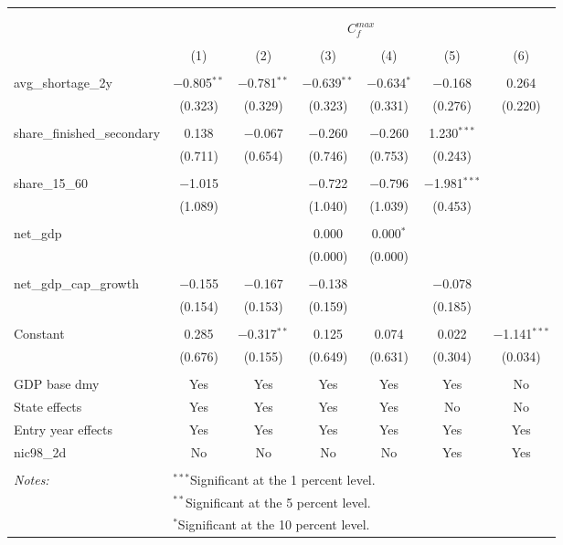 
\begingroup 
\small 
\begin{tabular}{@{\extracolsep{5pt}}lcccccc} 
\\[-1.8ex]\hline 
\hline \\[-1.8ex] 
\\[-1.8ex] & \multicolumn{6}{c}{$C^{max}_{f}$} \\ 
\\[-1.8ex] & (1) & (2) & (3) & (4) & (5) & (6)\\ 
\hline \\[-1.8ex] 
 avg\_shortage\_2y & $-$0.805$^{**}$ & $-$0.781$^{**}$ & $-$0.639$^{**}$ & $-$0.634$^{*}$ & $-$0.168 & 0.264 \\ 
  & (0.323) & (0.329) & (0.323) & (0.331) & (0.276) & (0.220) \\ 
  & & & & & & \\ 
 share\_finished\_secondary & 0.138 & $-$0.067 & $-$0.260 & $-$0.260 & 1.230$^{***}$ &  \\ 
  & (0.711) & (0.654) & (0.746) & (0.753) & (0.243) &  \\ 
  & & & & & & \\ 
 share\_15\_60 & $-$1.015 &  & $-$0.722 & $-$0.796 & $-$1.981$^{***}$ &  \\ 
  & (1.089) &  & (1.040) & (1.039) & (0.453) &  \\ 
  & & & & & & \\ 
 net\_gdp &  &  & 0.000 & 0.000$^{*}$ &  &  \\ 
  &  &  & (0.000) & (0.000) &  &  \\ 
  & & & & & & \\ 
 net\_gdp\_cap\_growth & $-$0.155 & $-$0.167 & $-$0.138 &  & $-$0.078 &  \\ 
  & (0.154) & (0.153) & (0.159) &  & (0.185) &  \\ 
  & & & & & & \\ 
 Constant & 0.285 & $-$0.317$^{**}$ & 0.125 & 0.074 & 0.022 & $-$1.141$^{***}$ \\ 
  & (0.676) & (0.155) & (0.649) & (0.631) & (0.304) & (0.034) \\ 
  & & & & & & \\ 
GDP base dmy & Yes & Yes & Yes & Yes & Yes & No \\ 
State effects & Yes & Yes & Yes & Yes & No & No \\ 
Entry year effects & Yes & Yes & Yes & Yes & Yes & Yes \\ 
nic98_2d & No & No & No & No & Yes & Yes \\ 
\hline \\[-1.8ex] 
\textit{Notes:} & \multicolumn{6}{l}{$^{***}$Significant at the 1 percent level.} \\ 
 & \multicolumn{6}{l}{$^{**}$Significant at the 5 percent level.} \\ 
 & \multicolumn{6}{l}{$^{*}$Significant at the 10 percent level.} \\ 
\end{tabular} 
\endgroup 

